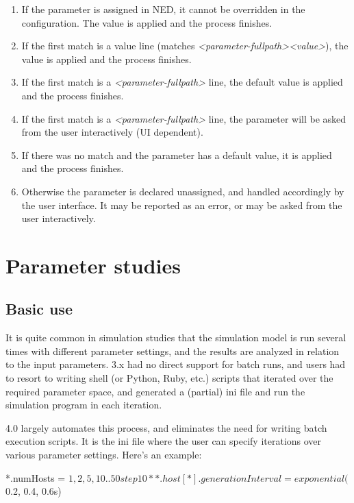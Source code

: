 \begin{enumerate}
\item If the parameter is assigned in NED, it cannot be overridden in the
    configuration. The value is applied and the process finishes.
\item If the first match is a value line (matches
    \textit{<parameter-fullpath>}\ttt{=}\textit{<value>}), the value is
    applied and the process finishes.
\item If the first match is a \textit{<parameter-fullpath>} line,
    the default value is applied and the process finishes.
\item If the first match is a \textit{<parameter-fullpath>} line,
    the parameter will be asked from the user interactively (UI dependent).
\item If there was no match and the parameter has a default value, it is applied
    and the process finishes.
\item Otherwise the parameter is declared unassigned, and handled accordingly
    by the user interface. It may be reported as an error, or may be
    asked from the user interactively.
\end{enumerate}


\section{Parameter studies}

\subsection{Basic use}


It is quite common in simulation studies that the simulation model is
run several times with different parameter settings, and the results
are analyzed in relation to the input parameters. {\opp} 3.x had no
direct support for batch runs, and users had to resort to writing shell
(or Python, Ruby, etc.) scripts that iterated over the required
parameter space, and generated a (partial) ini file and run the
simulation program in each iteration.

{\opp} 4.0 largely automates this process, and eliminates the need for
writing batch execution scripts. It is the ini file where the user can
specify iterations over various parameter settings.
Here's an example:

\begin{inifile}
*.numHosts = ${1, 2, 5, 10..50 step 10}
**.host[*].generationInterval = exponential(${0.2, 0.4, 0.6}s)
\end{inifile}


